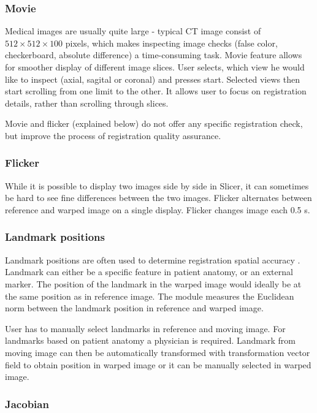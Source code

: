 \documentclass[type=dr, dr=rernat, accentcolor=tud7b,colorbacktitle, bigchapter, openright, twoside, 12pt ]{tudthesis}
\begin{document}
\subsubsection{Movie}

Medical images are usually quite large - typical CT image consist of $512 \times 512 \times 100$ pixels, which makes inspecting image checks (false color, checkerboard, absolute difference) a time-consuming task. Movie feature allows for smoother display of different image slices. User selects, which view he would like to inspect (axial, sagital or coronal) and presses start. Selected views then start scrolling from one limit to the other. It allows user to focus on registration details, rather than scrolling through slices.

Movie and flicker (explained below) do not offer any specific registration check, but improve the process of registration quality assurance.

\subsubsection{Flicker}

While it is possible to display two images side by side in Slicer, it can sometimes be hard to see fine differences between the two images. Flicker alternates between reference and warped image on a single display. Flicker changes image each 0.5 s.

\subsubsection{Landmark positions}

Landmark positions are often used to determine registration spatial accuracy \cite{Castillo2009}. Landmark can either be a specific feature in patient anatomy, or an external marker. The position of the landmark in the warped image would ideally be at the same position as in reference image. The module measures the Euclidean norm between the landmark position in reference and warped image.

User has to manually select landmarks in reference and moving image. For landmarks based on patient anatomy a physician is required. Landmark from moving image can then be automatically transformed with transformation vector field to obtain position in warped image or it can be manually selected in warped image.


\subsubsection{Jacobian}
\end{document}
